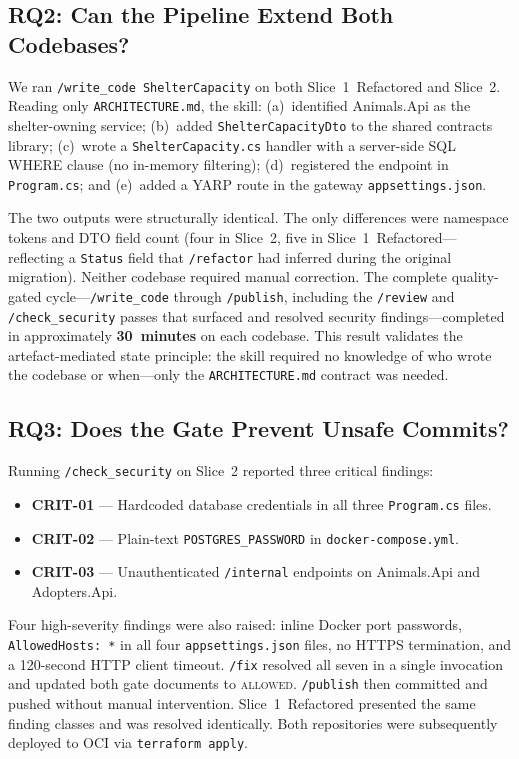 \documentclass[10pt,journal,compsoc]{IEEEtran}
\begin{document}
\subsection{RQ2: Can the Pipeline Extend Both Codebases?}
We ran \texttt{/write\_code ShelterCapacity} on both
Slice~1~Refactored and Slice~2.  Reading only
\texttt{ARCHITECTURE.md}, the skill:
(a)~identified Animals.Api as the shelter-owning service;
(b)~added \texttt{ShelterCapacityDto} to the shared contracts library;
(c)~wrote a \texttt{ShelterCapacity.cs} handler with a server-side
SQL WHERE clause (no in-memory filtering);
(d)~registered the endpoint in \texttt{Program.cs}; and
(e)~added a YARP route in the gateway \texttt{appsettings.json}.

The two outputs were structurally identical.  The only differences
were namespace tokens and DTO field count (four in Slice~2, five in
Slice~1~Refactored—reflecting a \texttt{Status} field that
\texttt{/refactor} had inferred during the original migration).
Neither codebase required manual correction.
The complete quality-gated cycle—\texttt{/write\_code} through
\texttt{/publish}, including the \texttt{/review} and
\texttt{/check\_security} passes that surfaced and resolved security
findings—completed in approximately \textbf{30~minutes} on each
codebase.  This result validates the artefact-mediated state
principle: the skill required no knowledge of who wrote the codebase
or when—only the \texttt{ARCHITECTURE.md} contract was needed.

\subsection{RQ3: Does the Gate Prevent Unsafe Commits?}
Running \texttt{/check\_security} on Slice~2 reported three critical
findings:

\begin{itemize}
  \item \textbf{CRIT-01} — Hardcoded database credentials in all three
        \texttt{Program.cs} files.
  \item \textbf{CRIT-02} — Plain-text \texttt{POSTGRES\_PASSWORD} in
        \texttt{docker-compose.yml}.
  \item \textbf{CRIT-03} — Unauthenticated \texttt{/internal}
        endpoints on Animals.Api and Adopters.Api.
\end{itemize}

Four high-severity findings were also raised: inline Docker port
passwords, \texttt{AllowedHosts:~*} in all four
\texttt{appsettings.json} files, no HTTPS termination, and a
120-second HTTP client timeout.  \texttt{/fix} resolved all seven in
a single invocation and updated both gate documents to
\textsc{allowed}.  \texttt{/publish} then committed and pushed without
manual intervention.  Slice~1~Refactored presented the same finding
classes and was resolved identically.  Both repositories were
subsequently deployed to OCI via \texttt{terraform~apply}.
\end{document}
